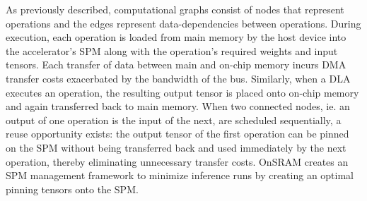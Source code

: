 

As previously described, computational graphs consist of nodes that represent
operations and the edges represent data-dependencies between operations. During
execution, each operation is loaded from main memory by the host device into
the accelerator's SPM along with the operation's required weights and input
tensors. Each transfer of data between main and on-chip memory incurs DMA
transfer costs exacerbated by the bandwidth of the bus. Similarly, when a DLA
executes an operation, the resulting output tensor is placed onto on-chip
memory and again transferred back to main memory.  When two connected nodes,
ie. an output of one operation is the input of the next, are scheduled
sequentially, a reuse opportunity exists: the output tensor of the first
operation can be pinned on the SPM without being transferred back and used
immediately by the next operation, thereby eliminating unnecessary transfer
costs. OnSRAM creates an SPM management framework to minimize inference runs
by creating an optimal pinning tensors onto the SPM.

